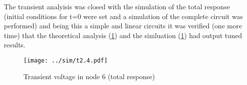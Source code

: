 The transient analyisis was closed with the simulation of the total response (initial conditions for t=0 were set and a simulation of the complete circuit was performed) and being this a simple and linear circuits it was verified (one more time) that the theoretical analysis (\ref{fig:trans2}) and the simluation (\ref{fig:trans2}) had output tuned results.

\begin{figure}[h] \centering
\texttt{[image: ../sim/t2.4.pdf]}
\caption{Transient voltage in node 6 (total response)}
\label{fig:trans2}
\end{figure}













